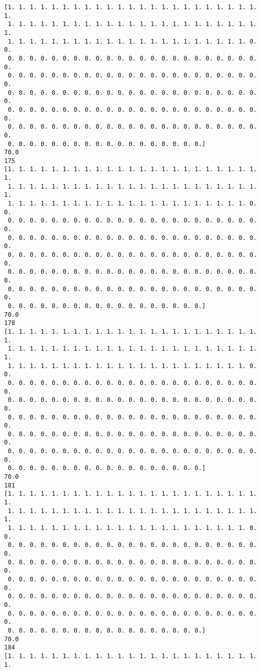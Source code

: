 \documentclass[11pt]{article}
\begin{document}
\begin{Verbatim}[commandchars=\\\{\}]
[1. 1. 1. 1. 1. 1. 1. 1. 1. 1. 1. 1. 1. 1. 1. 1. 1. 1. 1. 1. 1. 1. 1. 1.
 1. 1. 1. 1. 1. 1. 1. 1. 1. 1. 1. 1. 1. 1. 1. 1. 1. 1. 1. 1. 1. 1. 1. 1.
 1. 1. 1. 1. 1. 1. 1. 1. 1. 1. 1. 1. 1. 1. 1. 1. 1. 1. 1. 1. 1. 1. 0. 0.
 0. 0. 0. 0. 0. 0. 0. 0. 0. 0. 0. 0. 0. 0. 0. 0. 0. 0. 0. 0. 0. 0. 0. 0.
 0. 0. 0. 0. 0. 0. 0. 0. 0. 0. 0. 0. 0. 0. 0. 0. 0. 0. 0. 0. 0. 0. 0. 0.
 0. 0. 0. 0. 0. 0. 0. 0. 0. 0. 0. 0. 0. 0. 0. 0. 0. 0. 0. 0. 0. 0. 0. 0.
 0. 0. 0. 0. 0. 0. 0. 0. 0. 0. 0. 0. 0. 0. 0. 0. 0. 0. 0. 0. 0. 0. 0. 0.
 0. 0. 0. 0. 0. 0. 0. 0. 0. 0. 0. 0. 0. 0. 0. 0. 0. 0. 0. 0. 0. 0. 0. 0.
 0. 0. 0. 0. 0. 0. 0. 0. 0. 0. 0. 0. 0. 0. 0. 0. 0. 0.]
70.0
175
[1. 1. 1. 1. 1. 1. 1. 1. 1. 1. 1. 1. 1. 1. 1. 1. 1. 1. 1. 1. 1. 1. 1. 1.
 1. 1. 1. 1. 1. 1. 1. 1. 1. 1. 1. 1. 1. 1. 1. 1. 1. 1. 1. 1. 1. 1. 1. 1.
 1. 1. 1. 1. 1. 1. 1. 1. 1. 1. 1. 1. 1. 1. 1. 1. 1. 1. 1. 1. 1. 1. 0. 0.
 0. 0. 0. 0. 0. 0. 0. 0. 0. 0. 0. 0. 0. 0. 0. 0. 0. 0. 0. 0. 0. 0. 0. 0.
 0. 0. 0. 0. 0. 0. 0. 0. 0. 0. 0. 0. 0. 0. 0. 0. 0. 0. 0. 0. 0. 0. 0. 0.
 0. 0. 0. 0. 0. 0. 0. 0. 0. 0. 0. 0. 0. 0. 0. 0. 0. 0. 0. 0. 0. 0. 0. 0.
 0. 0. 0. 0. 0. 0. 0. 0. 0. 0. 0. 0. 0. 0. 0. 0. 0. 0. 0. 0. 0. 0. 0. 0.
 0. 0. 0. 0. 0. 0. 0. 0. 0. 0. 0. 0. 0. 0. 0. 0. 0. 0. 0. 0. 0. 0. 0. 0.
 0. 0. 0. 0. 0. 0. 0. 0. 0. 0. 0. 0. 0. 0. 0. 0. 0. 0.]
70.0
178
[1. 1. 1. 1. 1. 1. 1. 1. 1. 1. 1. 1. 1. 1. 1. 1. 1. 1. 1. 1. 1. 1. 1. 1.
 1. 1. 1. 1. 1. 1. 1. 1. 1. 1. 1. 1. 1. 1. 1. 1. 1. 1. 1. 1. 1. 1. 1. 1.
 1. 1. 1. 1. 1. 1. 1. 1. 1. 1. 1. 1. 1. 1. 1. 1. 1. 1. 1. 1. 1. 1. 0. 0.
 0. 0. 0. 0. 0. 0. 0. 0. 0. 0. 0. 0. 0. 0. 0. 0. 0. 0. 0. 0. 0. 0. 0. 0.
 0. 0. 0. 0. 0. 0. 0. 0. 0. 0. 0. 0. 0. 0. 0. 0. 0. 0. 0. 0. 0. 0. 0. 0.
 0. 0. 0. 0. 0. 0. 0. 0. 0. 0. 0. 0. 0. 0. 0. 0. 0. 0. 0. 0. 0. 0. 0. 0.
 0. 0. 0. 0. 0. 0. 0. 0. 0. 0. 0. 0. 0. 0. 0. 0. 0. 0. 0. 0. 0. 0. 0. 0.
 0. 0. 0. 0. 0. 0. 0. 0. 0. 0. 0. 0. 0. 0. 0. 0. 0. 0. 0. 0. 0. 0. 0. 0.
 0. 0. 0. 0. 0. 0. 0. 0. 0. 0. 0. 0. 0. 0. 0. 0. 0. 0.]
70.0
181
[1. 1. 1. 1. 1. 1. 1. 1. 1. 1. 1. 1. 1. 1. 1. 1. 1. 1. 1. 1. 1. 1. 1. 1.
 1. 1. 1. 1. 1. 1. 1. 1. 1. 1. 1. 1. 1. 1. 1. 1. 1. 1. 1. 1. 1. 1. 1. 1.
 1. 1. 1. 1. 1. 1. 1. 1. 1. 1. 1. 1. 1. 1. 1. 1. 1. 1. 1. 1. 1. 1. 0. 0.
 0. 0. 0. 0. 0. 0. 0. 0. 0. 0. 0. 0. 0. 0. 0. 0. 0. 0. 0. 0. 0. 0. 0. 0.
 0. 0. 0. 0. 0. 0. 0. 0. 0. 0. 0. 0. 0. 0. 0. 0. 0. 0. 0. 0. 0. 0. 0. 0.
 0. 0. 0. 0. 0. 0. 0. 0. 0. 0. 0. 0. 0. 0. 0. 0. 0. 0. 0. 0. 0. 0. 0. 0.
 0. 0. 0. 0. 0. 0. 0. 0. 0. 0. 0. 0. 0. 0. 0. 0. 0. 0. 0. 0. 0. 0. 0. 0.
 0. 0. 0. 0. 0. 0. 0. 0. 0. 0. 0. 0. 0. 0. 0. 0. 0. 0. 0. 0. 0. 0. 0. 0.
 0. 0. 0. 0. 0. 0. 0. 0. 0. 0. 0. 0. 0. 0. 0. 0. 0. 0.]
70.0
184
[1. 1. 1. 1. 1. 1. 1. 1. 1. 1. 1. 1. 1. 1. 1. 1. 1. 1. 1. 1. 1. 1. 1. 1.

\end{Verbatim}
\end{document}
